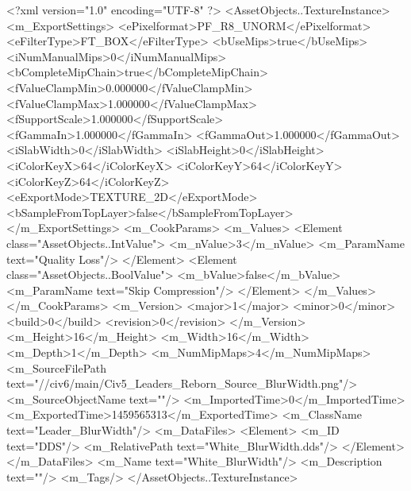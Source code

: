 <?xml version="1.0" encoding="UTF-8" ?>
<AssetObjects..TextureInstance>
	<m_ExportSettings>
		<ePixelformat>PF_R8_UNORM</ePixelformat>
		<eFilterType>FT_BOX</eFilterType>
		<bUseMips>true</bUseMips>
		<iNumManualMips>0</iNumManualMips>
		<bCompleteMipChain>true</bCompleteMipChain>
		<fValueClampMin>0.000000</fValueClampMin>
		<fValueClampMax>1.000000</fValueClampMax>
		<fSupportScale>1.000000</fSupportScale>
		<fGammaIn>1.000000</fGammaIn>
		<fGammaOut>1.000000</fGammaOut>
		<iSlabWidth>0</iSlabWidth>
		<iSlabHeight>0</iSlabHeight>
		<iColorKeyX>64</iColorKeyX>
		<iColorKeyY>64</iColorKeyY>
		<iColorKeyZ>64</iColorKeyZ>
		<eExportMode>TEXTURE_2D</eExportMode>
		<bSampleFromTopLayer>false</bSampleFromTopLayer>
	</m_ExportSettings>
	<m_CookParams>
		<m_Values>
			<Element class="AssetObjects..IntValue">
				<m_nValue>3</m_nValue>
				<m_ParamName text="Quality Loss"/>
			</Element>
			<Element class="AssetObjects..BoolValue">
				<m_bValue>false</m_bValue>
				<m_ParamName text="Skip Compression"/>
			</Element>
		</m_Values>
	</m_CookParams>
	<m_Version>
		<major>1</major>
		<minor>0</minor>
		<build>0</build>
		<revision>0</revision>
	</m_Version>
	<m_Height>16</m_Height>
	<m_Width>16</m_Width>
	<m_Depth>1</m_Depth>
	<m_NumMipMaps>4</m_NumMipMaps>
	<m_SourceFilePath text="//civ6/main/Civ5_Leaders_Reborn\Texture_Source\White_BlurWidth.png"/>
	<m_SourceObjectName text=""/>
	<m_ImportedTime>0</m_ImportedTime>
	<m_ExportedTime>1459565313</m_ExportedTime>
	<m_ClassName text="Leader_BlurWidth"/>
	<m_DataFiles>
		<Element>
			<m_ID text="DDS"/>
			<m_RelativePath text="White_BlurWidth.dds"/>
		</Element>
	</m_DataFiles>
	<m_Name text="White_BlurWidth"/>
	<m_Description text=""/>
	<m_Tags/>
</AssetObjects..TextureInstance>

